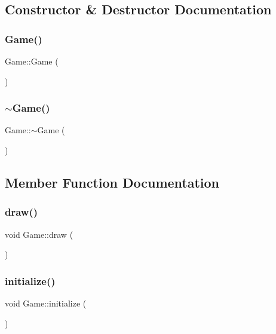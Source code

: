 \subsection{Constructor \& Destructor Documentation}
\mbox{\label{class_game_ad59df6562a58a614fda24622d3715b65}} 
\subsubsection{\texorpdfstring{Game()}{Game()}}
{\footnotesize\ttfamily Game\+::\+Game (\begin{DoxyParamCaption}{ }\end{DoxyParamCaption})}

\mbox{\label{class_game_ae3d112ca6e0e55150d2fdbc704474530}} 
\subsubsection{\texorpdfstring{$\sim$\+Game()}{~Game()}}
{\footnotesize\ttfamily Game\+::$\sim$\+Game (\begin{DoxyParamCaption}{ }\end{DoxyParamCaption})}



\subsection{Member Function Documentation}
\mbox{\label{class_game_a6d54497ce3a66f6dd45eacfdccc8d0bd}} 
\subsubsection{\texorpdfstring{draw()}{draw()}}
{\footnotesize\ttfamily void Game\+::draw (\begin{DoxyParamCaption}{ }\end{DoxyParamCaption})}

\mbox{\label{class_game_a14073b7ee15e3a60b72112519be85453}} 
\subsubsection{\texorpdfstring{initialize()}{initialize()}}
{\footnotesize\ttfamily void Game\+::initialize (\begin{DoxyParamCaption}{ }\end{DoxyParamCaption})}

